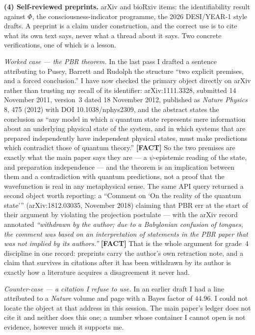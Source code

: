 \documentclass[11pt]{article}
\begin{document}
\textbf{(4) Self-reviewed preprints.} arXiv and bioRxiv items: the identifiability result against
$\Phi$, the consciousness-indicator programme, the 2026 DESI/YEAR-1 style drafts. A preprint is a
claim under construction, and the correct use is to cite what its own text says, never what a thread
about it says. Two concrete verifications, one of which is a lesson.

\emph{Worked case --- the PBR theorem.} In the last pass I drafted a sentence attributing to Pusey,
Barrett and Rudolph the structure ``two explicit premises, and a forced conclusion.'' I have now
checked the primary object directly on arXiv rather than trusting my recall of its identifier:
arXiv:1111.3328, submitted 14 November 2011, version~3 dated 18 November 2012, published as
\emph{Nature Physics} 8, 475 (2012) with DOI 10.1038/nphys2309, and the abstract states the conclusion
as ``any model in which a quantum state represents mere information about an underlying physical state
of the system, and in which systems that are prepared independently have independent physical states,
must make predictions which contradict those of quantum theory.'' \textbf{[FACT]} So the two premises
are exactly what the main paper says they are --- a $\psi$-epistemic reading of the state, and
preparation independence --- and the theorem is an implication between them and a contradiction with
quantum predictions, not a proof that the wavefunction is real in any metaphysical sense. The same API
query returned a second object worth reporting: a ``Comment on `On the reality of the quantum state'''
(arXiv:1812.03035, November 2018) claiming that PBR err at the start of their argument by violating
the projection postulate --- with the arXiv record annotated \emph{``withdrawn by the author; due to a
Babylonian confusion of tongues, the comment was based on an interpretation of statements in the PBR
paper that was not implied by its authors.''} \textbf{[FACT]} That is the whole argument for grade~4
discipline in one record: preprints carry the author's own retraction note, and a claim that survives
in citations after it has been withdrawn by its author is exactly how a literature acquires a
disagreement it never had.

\emph{Counter-case --- a citation I refuse to use.} In an earlier draft I had a line attributed to a
\emph{Nature} volume and page with a Bayes factor of $44.96$. I could not locate the object at that
address in this session. The main paper's ledger does not cite it and neither does this one; a
number whose container I cannot open is not evidence, however much it supports me.
\end{document}
